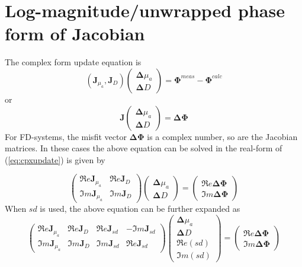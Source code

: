 \documentclass{article}
\begin{document}
\section{Log-magnitude/unwrapped phase form of Jacobian}
The complex form update equation is
\begin{equation}
\left(\mathbf{J}_{\mu_a},\mathbf{J}_{D}\right)\left(
\begin{array}{l}
\boldsymbol{\Delta}{\mu_a}\\
\boldsymbol{\Delta}{D}
\end{array}
\right)=\boldsymbol{\Phi}^{meas}-\boldsymbol{\Phi}^{calc}
\end{equation}
or
\begin{equation}
\label{eq:cpxupdate} \mathbf{J}\left(
\begin{array}{l}
\boldsymbol{\Delta}{\mu_a}\\
\boldsymbol{\Delta}{D}
\end{array}
\right)=\boldsymbol{\Delta}\boldsymbol{\Phi}
\end{equation}
For FD-systems, the misfit vector $\mathbf{\Delta\Phi}$ is a complex number, so are the Jacobian matrices. In these cases the above equation can be solved in the real-form of (\ref{eq:cpxupdate}) is given by

\begin{equation}\label{eq:singlewavelength}
\left(
\begin{array}{ll}
\Re e{\mathbf{J}}_{\mu_a} & \Re e{\mathbf{J}}_{D}\\
\Im m{\mathbf{J}}_{\mu_a} & \Im m{\mathbf{J}}_{D}
\end{array}\right)
\left(
\begin{array}{l}
\boldsymbol{\Delta}{\mu_a}\\
\boldsymbol{\Delta}{D}
\end{array}
\right)=\left(
\begin{array}{l}
\Re e{\boldsymbol{\Delta\Phi}}\\
\Im m{\boldsymbol{\Delta\Phi}}
\end{array}\right)
\end{equation}
When $sd$ is used, the above equation can be further expanded as
\begin{equation}
\label{eq:realupdate}\left(
\begin{array}{lllr}
\Re e{\mathbf{J}}_{\mu_a} & \Re e{\mathbf{J}}_{D} & \Re e{\mathbf{J}}_{sd} & -\Im m{\mathbf{J}}_{sd}\\
\Im m{\mathbf{J}}_{\mu_a} & \Im m{\mathbf{J}}_{D} & \Im m{\mathbf{J}}_{sd} & \Re e{\mathbf{J}}_{sd}
\end{array}\right)
\left(
\begin{array}{l}
\boldsymbol{\Delta}{\mu_a}\\
\boldsymbol{\Delta}{D}\\
\Re e({sd})\\
\Im m({sd})
\end{array}
\right)=\left(
\begin{array}{l}
\Re e{\boldsymbol{\Delta\Phi}}\\
\Im m{\boldsymbol{\Delta\Phi}}
\end{array}\right)
\end{equation}
\end{document}
